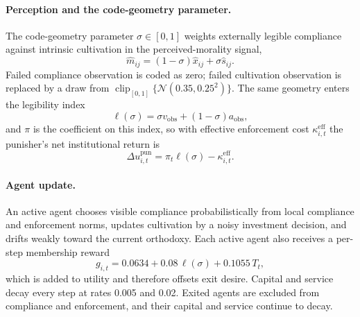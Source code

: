 \documentclass[12pt]{article}
\begin{document}
\paragraph{Perception and the code-geometry parameter.} The code-geometry
parameter \(\sigma\in[0,1]\) weights externally legible compliance against
intrinsic cultivation in the perceived-morality signal,
\begin{equation}
 \widehat m_{ij}=(1-\sigma)\widehat x_{ij}+\sigma\widehat s_{ij}.
\end{equation}
Failed compliance observation is coded as zero; failed cultivation observation
is replaced by a draw from
\(\operatorname{clip}_{[0,1]}\{\mathcal{N}(0.35,0.25^2)\}\). The same geometry
enters the legibility index
\begin{equation}
 \ell(\sigma)=\sigma v_{\mathrm{obs}}+(1-\sigma)a_{\mathrm{obs}},
\end{equation}
and \(\pi\) is the coefficient on this index, so with effective enforcement cost
\(\kappa_{i,t}^{\mathrm{eff}}\) the punisher's net institutional return is
\begin{equation}
 \Delta u_{i,t}^{\mathrm{pun}}=\pi_t\ell(\sigma)-\kappa_{i,t}^{\mathrm{eff}}.
\end{equation}

\paragraph{Agent update.} An active agent chooses visible compliance
probabilistically from local compliance and enforcement norms, updates
cultivation by a noisy investment decision, and drifts weakly toward the current
orthodoxy. Each active agent also receives a per-step membership reward
\begin{equation}
 g_{i,t}=0.0634+0.08\,\ell(\sigma)+0.1055\,T_t,
\end{equation}
which is added to utility and therefore offsets exit desire. Capital and service
decay every step at rates 0.005 and 0.02. Exited agents are excluded from
compliance and enforcement, and their capital and service continue to decay.
\end{document}
